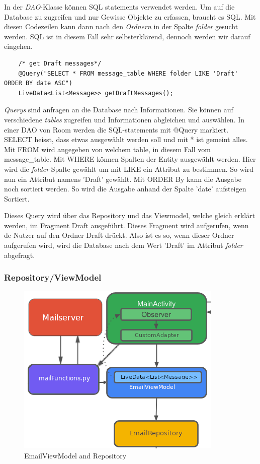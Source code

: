 \documentclass[a4paper,11pt]{article}
\begin{document}
In der \textit{DAO}-Klasse können SQL statements verwendet werden. Um auf die Database zu zugreifen und nur Gewisse 
Objekte zu erfassen, braucht es SQL. Mit diesen Codezeilen kann dann nach den \textit{Ordnern} in der Spalte \textit{folder} gesucht werden.
SQL ist in diesem Fall sehr selbsterklärend, 
dennoch werden wir darauf eingehen.\\

\lstset{language=SQL}
\begin{lstlisting}
    /* get Draft messages*/
    @Query("SELECT * FROM message_table WHERE folder LIKE 'Draft' ORDER BY date ASC")
    LiveData<List<Message>> getDraftMessages();
\end{lstlisting}

\textit{Querys} sind anfragen an die Database nach Informationen. Sie können auf verschiedene \textit{tables} zugreifen und Informationen abgleichen und auswählen. 
In einer DAO von Room werden die SQL-statements mit @Query markiert. SELECT heisst, dass etwas ausgewählt werden soll und mit * ist gemeint alles. Mit FROM wird angegeben von 
welchem table, in diesem Fall vom message\_table. Mit WHERE können Spalten der Entity ausgewählt werden. Hier wird die \textit{folder} Spalte 
gewählt um mit LIKE ein Attribut zu bestimmen. So wird nun ein Attribut namens 'Draft' gewählt. Mit ORDER By kann die Ausgabe noch sortiert werden. So wird die Ausgabe anhand der Spalte 'date'
aufsteigen Sortiert. \cite{queryExpl}

Dieses Query wird über das Repository und das Viewmodel, welche gleich erklärt werden, im Fragment Draft ausgeführt. Dieses Fragment wird aufgerufen, wenn de Nutzer 
auf den Ordner Draft drückt. Also ist es so, wenn dieser Ordner aufgerufen wird, wird die Database nach dem Wert 'Draft' im Attribut \textit{folder} abgefragt.

\subsubsection{Repository/ViewModel}

\begingroup
\setlength{\intextsep}{1pt}
\setlength{\columnsep}{4pt}

\begin{figure}
    \centering
    \includegraphics[width=.4\textwidth]{media/RepositoryDataInput.png}
    \caption{EmailViewModel and Repository
    \cite{appStructurePicture}}
\end{figure}
\end{document}
